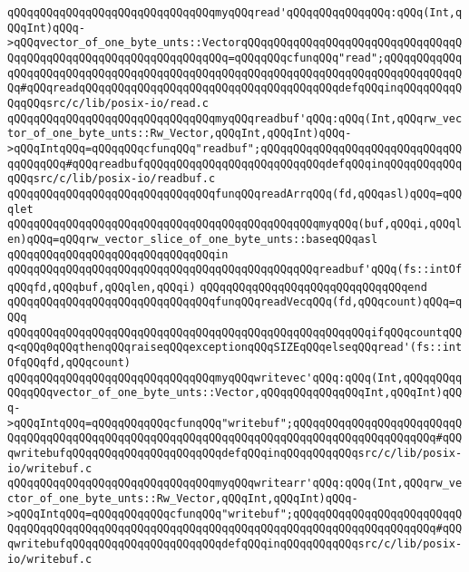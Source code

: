 \newline
\verb|qQQqqQQqqQQqqQQqqQQqqQQqqQQqqQQqmyqQQqread'qQQqqQQqqQQqqQQq:qQQq(Int,qQQqInt)qQQq->qQQqvector_of_one_byte_unts::VectorqQQqqQQqqQQqqQQqqQQqqQQqqQQqqQQqqQQqqQQqqQQqqQQqqQQqqQQqqQQqqQQqqQQq=qQQqqQQqcfunqQQq"read";qQQqqQQqqQQqqQQqqQQqqQQqqQQqqQQqqQQqqQQqqQQqqQQqqQQqqQQqqQQqqQQqqQQqqQQqqQQqqQQqqQQq#qQQqreadqQQqqQQqqQQqqQQqqQQqqQQqqQQqqQQqqQQqqQQqdefqQQqinqQQqqQQqqQQqqQQqsrc/c/lib/posix-io/read.c|\newline
\verb|qQQqqQQqqQQqqQQqqQQqqQQqqQQqqQQqmyqQQqreadbuf'qQQq:qQQq(Int,qQQqrw_vector_of_one_byte_unts::Rw_Vector,qQQqInt,qQQqInt)qQQq->qQQqIntqQQq=qQQqqQQqcfunqQQq"readbuf";qQQqqQQqqQQqqQQqqQQqqQQqqQQqqQQqqQQqqQQq#qQQqreadbufqQQqqQQqqQQqqQQqqQQqqQQqqQQqdefqQQqinqQQqqQQqqQQqqQQqsrc/c/lib/posix-io/readbuf.c|\newline
\newline
\verb|qQQqqQQqqQQqqQQqqQQqqQQqqQQqqQQqfunqQQqreadArrqQQq(fd,qQQqasl)qQQq=qQQqlet|\newline
\verb|qQQqqQQqqQQqqQQqqQQqqQQqqQQqqQQqqQQqqQQqqQQqqQQqmyqQQq(buf,qQQqi,qQQqlen)qQQq=qQQqrw_vector_slice_of_one_byte_unts::baseqQQqasl|\newline
\verb|qQQqqQQqqQQqqQQqqQQqqQQqqQQqqQQqin|\newline
\verb|qQQqqQQqqQQqqQQqqQQqqQQqqQQqqQQqqQQqqQQqqQQqqQQqreadbuf'qQQq(fs::intOfqQQqfd,qQQqbuf,qQQqlen,qQQqi)|\newline
\verb|qQQqqQQqqQQqqQQqqQQqqQQqqQQqqQQqend|\newline
\verb|qQQqqQQqqQQqqQQqqQQqqQQqqQQqqQQqfunqQQqreadVecqQQq(fd,qQQqcount)qQQq=qQQq|\newline
\verb|qQQqqQQqqQQqqQQqqQQqqQQqqQQqqQQqqQQqqQQqqQQqqQQqqQQqqQQqifqQQqcountqQQq<qQQq0qQQqthenqQQqraiseqQQqexceptionqQQqSIZEqQQqelseqQQqread'(fs::intOfqQQqfd,qQQqcount)|\newline
\newline
\verb|qQQqqQQqqQQqqQQqqQQqqQQqqQQqqQQqmyqQQqwritevec'qQQq:qQQq(Int,qQQqqQQqqQQqqQQqvector_of_one_byte_unts::Vector,qQQqqQQqqQQqqQQqInt,qQQqInt)qQQq->qQQqIntqQQq=qQQqqQQqqQQqcfunqQQq"writebuf";qQQqqQQqqQQqqQQqqQQqqQQqqQQqqQQqqQQqqQQqqQQqqQQqqQQqqQQqqQQqqQQqqQQqqQQqqQQqqQQqqQQqqQQqqQQq#qQQqwritebufqQQqqQQqqQQqqQQqqQQqqQQqdefqQQqinqQQqqQQqqQQqsrc/c/lib/posix-io/writebuf.c|\newline
\verb|qQQqqQQqqQQqqQQqqQQqqQQqqQQqqQQqmyqQQqwritearr'qQQq:qQQq(Int,qQQqrw_vector_of_one_byte_unts::Rw_Vector,qQQqInt,qQQqInt)qQQq->qQQqIntqQQq=qQQqqQQqqQQqcfunqQQq"writebuf";qQQqqQQqqQQqqQQqqQQqqQQqqQQqqQQqqQQqqQQqqQQqqQQqqQQqqQQqqQQqqQQqqQQqqQQqqQQqqQQqqQQqqQQqqQQq#qQQqwritebufqQQqqQQqqQQqqQQqqQQqqQQqdefqQQqinqQQqqQQqqQQqsrc/c/lib/posix-io/writebuf.c|\newline
